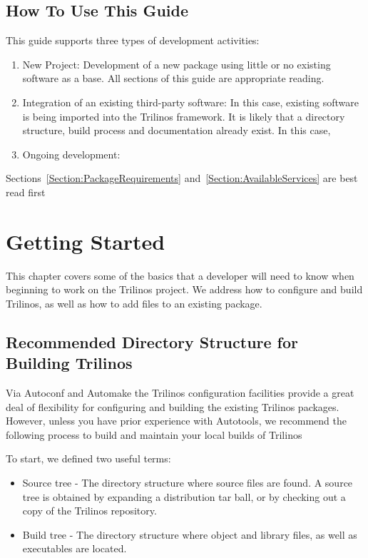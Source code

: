 \documentclass[12pt,relax]{TrilinosDevGuide}
\begin{document}
\subsection{How To Use This Guide}

This guide supports three types of development activities:
\begin{enumerate}
\item New Project: Development of a new package using little or no
existing software as a base.  All sections of this guide are
appropriate reading.
\item Integration of an existing third-party software: In this case,
existing software is being imported into the Trilinos framework.  It
is likely that a directory structure, build process and documentation
already exist.  In this case,
\item Ongoing development:
\end{enumerate}
Sections~\ref{Section:PackageRequirements}
and~\ref{Section:AvailableServices} are best read first

\section{Getting Started}
\label{Section:GettingStarted}
This chapter covers some of the basics that a developer will need to know when 
beginning to work on the Trilinos project.  We address how to configure and 
build Trilinos, as well as how to add files to an existing package.

\subsection{Recommended Directory Structure for Building Trilinos}

Via Autoconf and Automake the Trilinos configuration facilities
provide a great deal of flexibility for configuring and building the
existing Trilinos packages.  However, unless you have prior experience
with Autotools, we recommend the following process to build and
maintain your local builds of Trilinos

To start, we defined two useful terms:
\begin{itemize}
\item Source tree - The directory structure where source files are found.  A source 
tree is obtained by expanding a distribution tar ball, or by checking 
out a copy of the Trilinos repository.  
\item Build tree - The directory structure where object and library files, as well 
as executables are located.  
\end{itemize}
 
\end{document}
